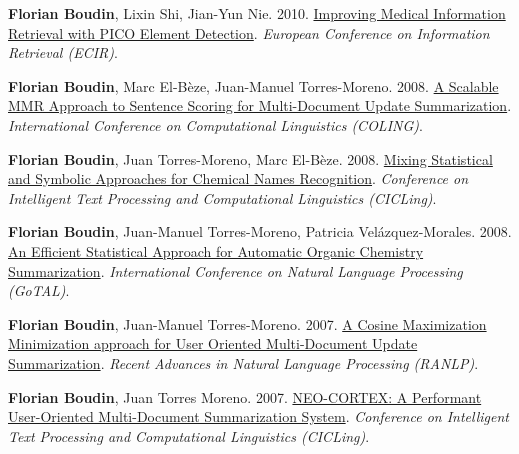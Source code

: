 \item 
\textbf{Florian Boudin}, Lixin Shi, Jian-Yun Nie.
2010.
\href{https://link.springer.com/chapter/10.1007/978-3-642-12275-0_8}{Improving Medical Information Retrieval with PICO Element Detection}.
\textit{European Conference on Information Retrieval (ECIR)}.
\label{boudin-etal-2010-improving}

\item 
\textbf{Florian Boudin}, Marc El-Bèze, Juan-Manuel Torres-Moreno.
2008.
\href{https://aclanthology.org/C08-2006.pdf}{A Scalable MMR Approach to Sentence Scoring for Multi-Document Update Summarization}.
\textit{International Conference on Computational Linguistics (COLING)}.
\label{boudin-etal-2008-scalable}

\item 
\textbf{Florian Boudin}, Juan Torres-Moreno, Marc El-Bèze.
2008.
\href{https://link.springer.com/chapter/10.1007/978-3-540-78135-6_28}{Mixing Statistical and Symbolic Approaches for Chemical Names Recognition}.
\textit{Conference on Intelligent Text Processing and Computational Linguistics (CICLing)}.
\label{boudin-etal-2008-mixing}

\item 
\textbf{Florian Boudin}, Juan-Manuel Torres-Moreno, Patricia Velázquez-Morales.
2008.
\href{https://link.springer.com/content/pdf/10.1007/978-3-540-85287-2_9}{An Efficient Statistical Approach for Automatic Organic Chemistry Summarization}.
\textit{International Conference on Natural Language Processing (GoTAL)}.
\label{boudin-etal-2008-efficient}

\item 
\textbf{Florian Boudin}, Juan-Manuel Torres-Moreno.
2007.
\href{https://hal.science/hal-01313205}{A Cosine Maximization Minimization approach for User Oriented Multi-Document Update Summarization}.
\textit{Recent Advances in Natural Language Processing (RANLP)}.
\label{boudin-torres-moreno-2007-cosine}

\item 
\textbf{Florian Boudin}, Juan Torres Moreno.
2007.
\href{https://link.springer.com/chapter/10.1007/978-3-540-70939-8_49}{NEO-CORTEX: A Performant User-Oriented Multi-Document Summarization System}.
\textit{Conference on Intelligent Text Processing and Computational Linguistics (CICLing)}.
\label{boudin-torres-moreno-2007-neo}